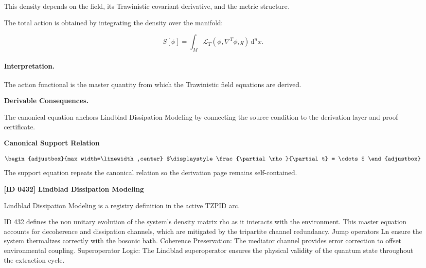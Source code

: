 This density depends on the field, its Trawinistic covariant derivative, and the metric structure.

The total action is obtained by integrating the density over the manifold:

\begin{equation}
\boxed{
S[\phi]
=
\int_M
\mathcal{L}_T
\left(
\phi,\nabla^T\phi,g
\right)
\,\mathrm{d}^n x .
}
\end{equation}

\paragraph{Interpretation.}
The action functional is the master quantity from which the Trawinistic field equations are derived.

\par\vspace{0.35em}
\noindent\textbf{Derivable Consequences.}\quad
\begingroup
\footnotesize
\raggedright
The canonical equation anchors Lindblad Dissipation Modeling by connecting the source condition to the derivation layer and proof certificate.
\par\endgroup

\noindent\textbf{Canonical Support Relation}\par
\[
\begin{adjustbox}{max width=\linewidth,center}
$\displaystyle
\frac{\partial \rho}{\partial t} = \cdots
$
\end{adjustbox}
\]
\noindent The support equation repeats the canonical relation so the derivation page remains self-contained.\par

\clearpage
\noindent\textbf{[ID 0432] Lindblad Dissipation Modeling}\par
\vspace{0.35em}
\begingroup\small
{}
Lindblad Dissipation Modeling is a registry definition in the active TZPID arc.

ID 432 defines the non unitary evolution of the system's density matrix rho as it interacts with the environment. This master equation accounts for decoherence and dissipation channels, which are mitigated by the tripartite channel redundancy. Jump operators Ln ensure the system thermalizes correctly with the bosonic bath. Coherence Preservation: The mediator channel provides error correction to offset environmental coupling. Superoperator Logic: The Lindblad superoperator ensures the physical validity of the quantum state throughout the extraction cycle.

